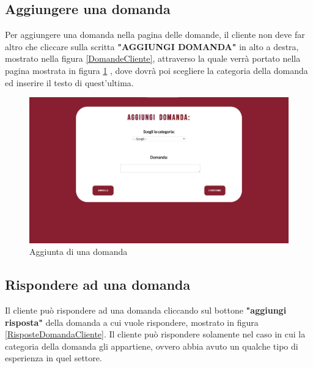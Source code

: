 \documentclass [a4paper, 12pt]{book}
\begin{document}
\subsection{Aggiungere una domanda}
Per aggiungere una domanda nella pagina delle domande, il cliente non deve far altro che cliccare sulla scritta \textbf{"AGGIUNGI DOMANDA"} in alto a destra, mostrato nella figura \ref{DomandeCliente}, attraverso la quale verrà portato nella pagina mostrata in figura \ref{AggiungiDomanda} , dove dovrà poi scegliere la categoria della domanda ed inserire il testo di quest'ultima.
\begin{figure}[!h]
\centering
\includegraphics[scale=0.3]{AggiungiDomanda.png}
\caption{Aggiunta di una domanda}
\label{AggiungiDomanda}
\end{figure}

\subsection{Rispondere ad una domanda}
Il cliente può rispondere ad una domanda cliccando sul bottone \textbf{"aggiungi risposta"} della domanda a cui vuole rispondere, mostrato in figura \ref{RisposteDomandaCliente}. Il cliente può rispondere solamente nel caso in cui la categoria della domanda gli appartiene, ovvero abbia avuto un qualche tipo di esperienza in quel settore.
\end{document}
